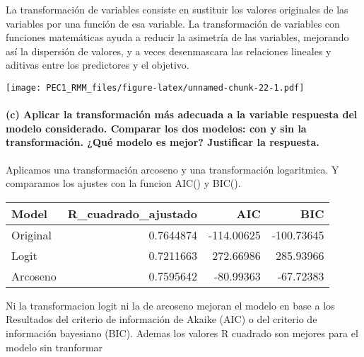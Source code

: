 \documentclass[
]{article}
\begin{document}
La transformación de variables consiste en sustituir los valores
originales de las variables por una función de esa variable. La
transformación de variables con funciones matemáticas ayuda a reducir la
asimetría de las variables, mejorando así la dispersión de valores, y a
veces desenmascara las relaciones lineales y aditivas entre los
predictores y el objetivo.

\texttt{[image: PEC1\_RMM\_files/figure-latex/unnamed-chunk-22-1.pdf]}

\hypertarget{c-aplicar-la-transformaciuxf3n-muxe1s-adecuada-a-la-variable-respuesta-del-modelo-considerado.-comparar-los-dos-modelos-con-y-sin-la-transformaciuxf3n.-quuxe9-modelo-es-mejor-justificar-la-respuesta.}{%
\paragraph{\texorpdfstring{\textbf{(c) Aplicar la transformación más
adecuada a la variable respuesta del modelo considerado. Comparar los
dos modelos: con y sin la transformación. ¿Qué modelo es mejor?
Justificar la
respuesta.}}{(c) Aplicar la transformación más adecuada a la variable respuesta del modelo considerado. Comparar los dos modelos: con y sin la transformación. ¿Qué modelo es mejor? Justificar la respuesta.}}\label{c-aplicar-la-transformaciuxf3n-muxe1s-adecuada-a-la-variable-respuesta-del-modelo-considerado.-comparar-los-dos-modelos-con-y-sin-la-transformaciuxf3n.-quuxe9-modelo-es-mejor-justificar-la-respuesta.}}

Aplicamos una transformación arcoseno y una transformación logaritmica.
Y comparamos los ajustes con la funcion AIC() y BIC().

\begin{longtable}[]{@{}lrrr@{}}
\toprule\noalign{}
Model & R\_cuadrado\_ajustado & AIC & BIC \\
\midrule\noalign{}
\endhead
\bottomrule\noalign{}
\endlastfoot
Original & 0.7644874 & -114.00625 & -100.73645 \\
Logit & 0.7211663 & 272.66986 & 285.93966 \\
Arcoseno & 0.7595642 & -80.99363 & -67.72383 \\
\end{longtable}

Ni la transformacion logit ni la de arcoseno mejoran el modelo en base a
los Resultados del criterio de información de Akaike (AIC) o del
criterio de información bayesiano (BIC). Ademas los valores R cuadrado
son mejores para el modelo sin tranformar
\end{document}
